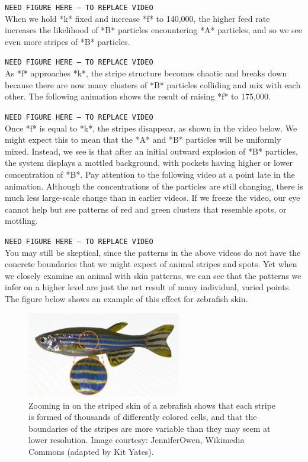 {\texttt{NEED FIGURE HERE -- TO REPLACE VIDEO}\\

When we hold *k* fixed and increase *f* to 140,000, the higher feed rate increases the likelihood of *B* particles encountering *A* particles, and so we see even more stripes of *B* particles.

\texttt{NEED FIGURE HERE -- TO REPLACE VIDEO}\\

As *f* approaches *k*, the stripe structure becomes chaotic and breaks down because there are now many clusters of *B* particles colliding and mix with each other. The following animation shows the result of raising *f* to 175,000.

\texttt{NEED FIGURE HERE -- TO REPLACE VIDEO}\\

Once *f* is equal to *k*, the stripes disappear, as shown in the video below. We might expect this to mean that the *A* and *B* particles will be uniformly mixed. Instead, we see is that after an initial outward explosion of *B* particles, the system displays a mottled background, with pockets having higher or lower concentration of *B*. Pay attention to the following video at a point late in the animation. Although the concentrations of the particles are still changing, there is much less large-scale change than in earlier videos. If we freeze the video, our eye cannot help but see patterns of red and green clusters that resemble spots, or mottling.

\texttt{NEED FIGURE HERE -- TO REPLACE VIDEO}\\

You may still be skeptical, since the patterns in the above videos do not have the concrete boundaries that we might expect of animal stripes and spots. Yet when we closely examine an animal with skin patterns, we can see that the patterns we infer on a higher level are just the net result of many individual, varied points. The figure below shows an example of this effect for zebrafish skin.

\begin{figure}[h]
\centering
\mySfFamily
\includegraphics[width = 0.6\textwidth]{../assets/images/600px/zebrafish_zoom.jpg}
\caption{Zooming in on the striped skin of a zebrafish shows that each stripe is formed of thousands of differently colored cells, and that the boundaries of the stripes are more variable than they may seem at lower resolution. Image courtesy: JenniferOwen, Wikimedia Commons (adapted by Kit Yates).}
\label{fig:zebrafish_zoom}
\end{figure}

}
